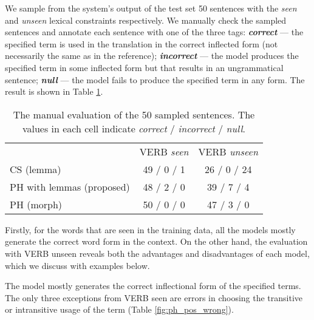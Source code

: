We sample from the system's output of the test set 50 sentences with the {\it seen} and {\it unseen} lexical constraints respectively.
We manually check the sampled sentences and annotate each sentence with one of the three tags: {\bf {\it correct}} --- the specified term is used in the translation in the correct inflected form (not necessarily the same as in the reference); {\bf {\it incorrect}} --- the model produces the specified term in some inflected form but that results in an ungrammatical sentence; {\bf {\it null}} --- the model fails to produce the specified term in any form.
The result is shown in Table \ref{table:results-manual}.

\begin{table}[]
  \centering
  \begin{tabular}{lcc} \toprule
                            & VERB {\it seen}  & VERB {\it unseen} \\
  CS (lemma)            & 49 / 0 / 1 & 26 / 0 / 24 \\
  PH with lemmas (proposed) & 48 / 2 / 0 & 39 / 7 / 4  \\
  PH (morph)          & 50 / 0 / 0 & 47 / 3 / 0 \\ \bottomrule
  \end{tabular}
\caption{The manual evaluation of the 50 sampled sentences. The values in each cell indicate {\it correct} / {\it incorrect} / {\it null}.}
\label{table:results-manual}
\end{table}

Firstly, for the words that are seen in the training data, all the models mostly generate the correct word form in the context.
On the other hand, the evaluation with VERB unseen reveals both the advantages and disadvantages of each model, which we discuss with examples below.

The model mostly generates the correct inflectional form of the specified terms.
The only three exceptions from VERB seen are errors in choosing the transitive or intransitive usage of the term (Table \ref{fig:ph_pos_wrong}).

